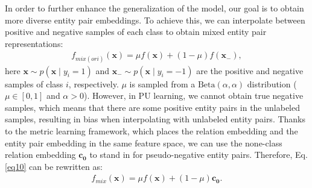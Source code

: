 \documentclass[letterpaper]{article} %
\begin{document}
In order to further enhance the generalization of the model, our goal is to obtain more diverse entity pair embeddings. To achieve this, we can interpolate between positive and negative samples of each class to obtain mixed entity pair representations:
\begin{equation}
\begin{aligned}\label{eq10}
f_{mix(ori)}(\boldsymbol{x})=\mu f(\boldsymbol{x})+(1-\mu) f(\boldsymbol{x}_{-}),
\end{aligned}
\end{equation}
here $\boldsymbol{x} \sim p(\boldsymbol{x} \mid y_{i}=1)$ and $\boldsymbol{x}_{-} \sim p(\boldsymbol{x} \mid y_{i}=-1)$ are the positive and negative samples of class $i$, respectively. $\mu$ is sampled from
a $\mathrm{Beta}(\alpha, \alpha)$ distribution ($\mu \in [0, 1]$ and $\alpha > 0$). However, in PU learning, we cannot obtain true negative samples, which means that there are some positive entity pairs in the unlabeled samples, resulting in bias when interpolating with unlabeled entity pairs. Thanks to the metric learning framework, which places the relation embedding and the entity pair embedding in the same feature space, we can use the none-class relation embedding $\boldsymbol{c_{0}}$ to stand in for pseudo-negative entity pairs. Therefore, Eq.\ref{eq10} can be rewritten as:
\begin{equation}
\begin{aligned}\label{eq11}
f_{mix}(\boldsymbol{x})=\mu f(\boldsymbol{x})+(1-\mu) \boldsymbol{c_{0}}.
\end{aligned}
\end{equation}
\end{document}

